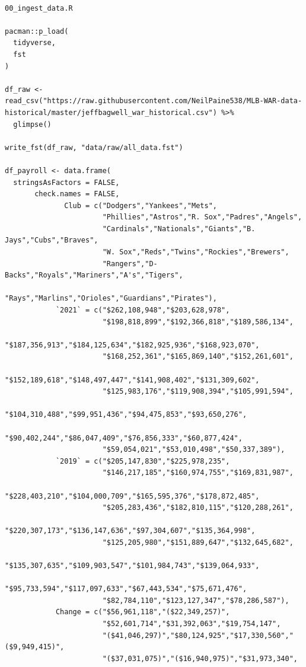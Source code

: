 \documentclass{article}
\begin{document}
\begin{singlespace}
\begin{verbatim}

00_ingest_data.R

pacman::p_load(
  tidyverse,
  fst
)

df_raw <- read_csv("https://raw.githubusercontent.com/NeilPaine538/MLB-WAR-data-historical/master/jeffbagwell_war_historical.csv") %>% 
  glimpse()

write_fst(df_raw, "data/raw/all_data.fst")

df_payroll <- data.frame(
  stringsAsFactors = FALSE,
       check.names = FALSE,
              Club = c("Dodgers","Yankees","Mets",
                       "Phillies","Astros","R. Sox","Padres","Angels",
                       "Cardinals","Nationals","Giants","B. Jays","Cubs","Braves",
                       "W. Sox","Reds","Twins","Rockies","Brewers",
                       "Rangers","D-Backs","Royals","Mariners","A's","Tigers",
                       "Rays","Marlins","Orioles","Guardians","Pirates"),
            `2021` = c("$262,108,948","$203,628,978",
                       "$198,818,899","$192,366,818","$189,586,134",
                       "$187,356,913","$184,125,634","$182,925,936","$168,923,070",
                       "$168,252,361","$165,869,140","$152,261,601",
                       "$152,189,618","$148,497,447","$141,908,402","$131,309,602",
                       "$125,983,176","$119,908,394","$105,991,594",
                       "$104,310,488","$99,951,436","$94,475,853","$93,650,276",
                       "$90,402,244","$86,047,409","$76,856,333","$60,877,424",
                       "$59,054,021","$53,010,498","$50,337,389"),
            `2019` = c("$205,147,830","$225,978,235",
                       "$146,217,185","$160,974,755","$169,831,987",
                       "$228,403,210","$104,000,709","$165,595,376","$178,872,485",
                       "$205,283,436","$182,810,115","$120,288,261",
                       "$220,307,173","$136,147,636","$97,304,607","$135,364,998",
                       "$125,205,980","$151,889,647","$132,645,682",
                       "$135,307,635","$109,903,547","$101,984,743","$139,064,933",
                       "$95,733,594","$117,097,633","$67,443,534","$75,671,476",
                       "$82,784,110","$123,127,347","$78,286,587"),
            Change = c("$56,961,118","($22,349,257)",
                       "$52,601,714","$31,392,063","$19,754,147",
                       "($41,046,297)","$80,124,925","$17,330,560","($9,949,415)",
                       "($37,031,075)","($16,940,975)","$31,973,340",

\end{verbatim}
\end{singlespace}
\end{document}
